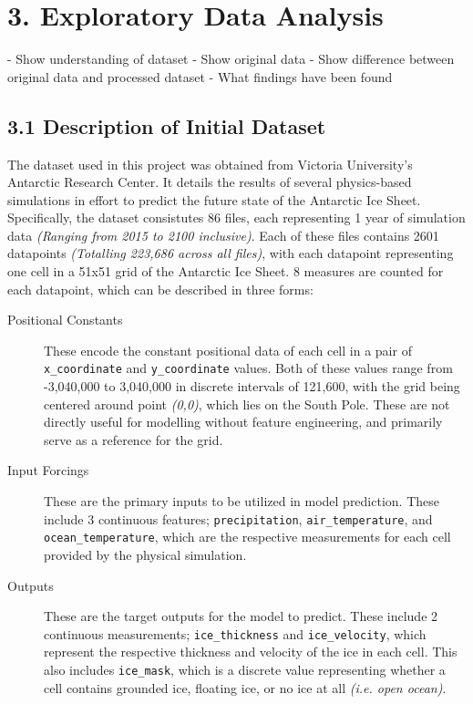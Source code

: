 \documentclass[11pt, a4paper, twoside, openright]{report}
\begin{document}

\chapter*{3. Exploratory Data Analysis}
- Show understanding of dataset
- Show original data
- Show difference between original data and processed dataset
- What findings have been found

\section*{3.1 Description of Initial Dataset}

The dataset used in this project was obtained from Victoria University's Antarctic Research Center.
It details the results of several physics-based simulations in effort to predict the future state of the Antarctic Ice Sheet.
Specifically, the dataset consistutes 86 files, each representing 1 year of simulation data \textit{(Ranging from 2015 to 2100 inclusive)}.
Each of these files contains 2601 datapoints \textit{(Totalling 223,686 across all files)}, with each datapoint representing one cell in 
a 51x51 grid of the Antarctic Ice Sheet. 8 measures are counted for each datapoint, which can be described in three forms:
\begin{description}
  \item[Positional Constants] These encode the constant positional data of each cell in a pair of 
  \texttt{x\_coordinate} and \texttt{y\_coordinate} values.
  Both of these values range from -3,040,000 to 3,040,000 in discrete intervals of 121,600,
  with the grid being centered around point \textit{(0,0)}, which lies on the South Pole.
  These are not directly useful for modelling without feature engineering, and primarily serve as a reference for the grid.
  \item[Input Forcings] These are the primary inputs to be utilized in model prediction.
  These include 3 continuous features; \texttt{precipitation}, \texttt{air\_temperature}, and \texttt{ocean\_temperature}, 
  which are the respective measurements for each cell provided by the physical simulation. 
  \item[Outputs] These are the target outputs for the model to predict. 
  These include 2 continuous measurements; \texttt{ice\_thickness} and \texttt{ice\_velocity},
  which represent the respective thickness and velocity of the ice in each cell. 
  This also includes \texttt{ice\_mask}, which is a discrete value representing
  whether a cell contains grounded ice, floating ice, or no ice at all \textit{(i.e. open ocean)}.
\end{description}
\end{document}
